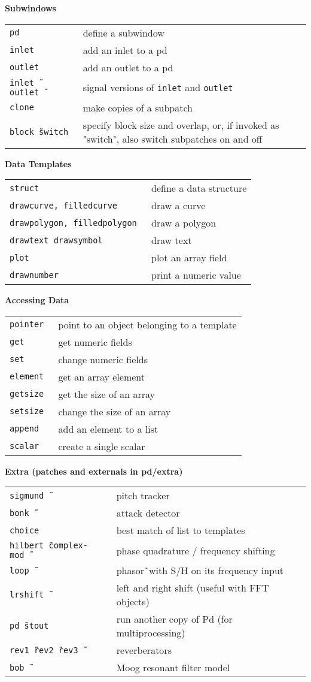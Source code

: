 \documentclass[a4paper, landscape, 9pt]{extarticle}
\newcommand{\refcardtitle}[1]{
  \begin{center}
    \textbf{\small{#1}}
  \end{center}
}
\begin{document}
\begin{multicols}{3}
  \refcardtitle{Subwindows}
  \begin{tabularx}{9cm}{>{\tt}l X}
    pd & define a subwindow \\
    inlet & add an inlet to a pd \\
    outlet & add an outlet to a pd \\
    inlet\~\, outlet\~\ & signal versions of \texttt{inlet} and \texttt{outlet} \\
    clone & make copies of a subpatch \\
    block\~\ switch & specify block size and overlap, or, if invoked as "switch", also switch subpatches on and off \\
  \end{tabularx}

  \refcardtitle{Data Templates}
  \begin{tabularx}{9cm}{>{\tt}l X}
    struct & define a data structure \\
    drawcurve, filledcurve & draw a curve \\
    drawpolygon, filledpolygon & draw a polygon \\
    drawtext drawsymbol & draw text \\
    plot & plot an array field \\
    drawnumber & print a numeric value \\
    \end{tabularx}

  \refcardtitle{Accessing Data}
  \begin{tabularx}{9cm}{>{\tt}l X}
    pointer & point to an object belonging to a template \\
    get & get numeric fields \\
    set & change numeric fields \\
    element & get an array element \\
    getsize & get the size of an array \\
    setsize & change the size of an array \\
    append & add an element to a list \\
    scalar & create a single scalar \\
  \end{tabularx}
  
  \refcardtitle{Extra (patches and externals in pd/extra)}
  \begin{tabularx}{9cm}{>{\tt}l X}
  	sigmund\~\ & pitch tracker \\
  	bonk\~\ & attack detector \\
  	choice & best match of list to templates \\
  	hilbert\~\ complex-mod\~\ & phase quadrature / frequency shifting \\
  	loop\~\ & phasor\~\ with S/H on its frequency input\\
  	lrshift\~\ & left and right shift (useful with FFT objects) \\
  	pd\~\ stout & run another copy of Pd (for multiprocessing) \\ 
  	rev1\~\ rev2\~\ rev3\~\ & reverberators \\
  	bob\~\ & Moog resonant filter model \\
  	

\end{tabularx}
\end{multicols}
\end{document}
